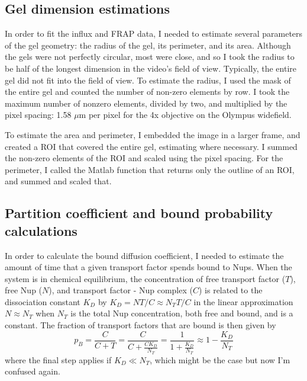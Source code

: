 \subsection{Gel dimension estimations}
In order to fit the influx and FRAP data, I needed to estimate several parameters of the gel geometry: the radius of the gel, its perimeter, and its area.  Although the gels were not perfectly circular, most were close, and so I took the radius to be half of the longest dimension in the video's field of view.  Typically, the entire gel did not fit into the field of view.   To estimate the radius, I used the mask of the entire gel and counted the number of non-zero elements by row.  I took the maximum number of nonzero elements, divided by two, and multiplied by the pixel spacing: 1.58 $\mu$m per pixel for the 4x objective on the Olympus widefield.

To estimate the area and perimeter, I embedded the image in a larger frame, and created a ROI that covered the entire gel, estimating where necessary.  I summed the non-zero elements of the ROI and scaled using the pixel spacing.  For the perimeter, I called the Matlab function that returns only the outline of an ROI, and summed and scaled that.

\subsection{Partition coefficient and bound probability calculations}
In order to calculate the bound diffusion coefficient, I needed to estimate the amount of time that a given transport factor spends bound to Nups.  When the system is in chemical equilibrium, the concentration of free transport factor ($T$), free Nup ($N$), and transport factor - Nup complex ($C$) is related to the dissociation constant $K_D$ by
$K_D = NT/C \approx N_TT/C$ in the linear approximation $N \approx N_T$ when $N_T$ is the total Nup concentration, both free and bound, and is a constant.  The fraction of transport factors that are bound is then given by
\begin{equation}
p_B = \frac{C}{C+T} = \frac{C}{C+\frac{CK_D}{N_T}} = \frac{1}{1+\frac{K_D}{N_T}} \approx 1 - \frac{K_D}{N_T}
\label{eq:bound-prob}
\end{equation} where the final step applies if $K_D \ll N_T$, which might be the case but now I'm confused again.

